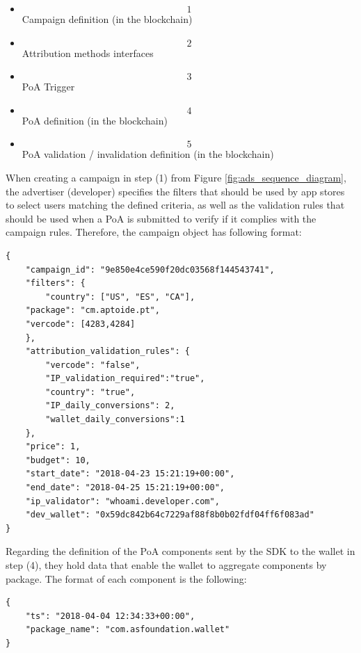 \begin{itemize}
\item \[1\] Campaign definition (in the blockchain)
\item \[2\] Attribution methods interfaces 
\item \[3\] PoA Trigger
\item \[4\] PoA definition (in the blockchain) 
\item \[5\] PoA validation / invalidation definition (in the blockchain)
\end{itemize}


When creating a campaign in step \textsf{(1)} from Figure \ref{fig:ads_sequence_diagram}, the advertiser (developer) specifies the filters that should be used by app stores to select users matching the defined criteria, as well as the validation rules that should be used when a \textsf{PoA} is submitted to verify if it complies with the campaign rules. Therefore, the campaign object has following format:
\begin{tcolorbox}[enhanced jigsaw,sharp corners, drop fuzzy shadow=ShadowColor]
\begin{lstlisting}[xleftmargin=0.05\textwidth]
{
    "campaign_id": "9e850e4ce590f20dc03568f144543741",
    "filters": {
        "country": ["US", "ES", "CA"],
	"package": "cm.aptoide.pt",
	"vercode": [4283,4284]
    },
    "attribution_validation_rules": {
        "vercode": "false",
        "IP_validation_required":"true",
        "country": "true",
        "IP_daily_conversions": 2,
        "wallet_daily_conversions":1
    },
    "price": 1,
    "budget": 10,
    "start_date": "2018-04-23 15:21:19+00:00",
    "end_date": "2018-04-25 15:21:19+00:00",
    "ip_validator": "whoami.developer.com",
    "dev_wallet": "0x59dc842b64c7229af88f8b0b02fdf04ff6f083ad"
}
\end{lstlisting}
\end{tcolorbox}

Regarding the definition of the \textsf{PoA} components sent by the SDK to the wallet in step \textsf{(4)}, they hold data that enable the wallet to aggregate components by package. The format of each component is the following:
\begin{tcolorbox}[enhanced jigsaw,sharp corners, drop fuzzy shadow=ShadowColor]
\begin{lstlisting}[xleftmargin=0.05\textwidth]
{
    "ts": "2018-04-04 12:34:33+00:00",
    "package_name": "com.asfoundation.wallet"
}
\end{lstlisting}
\end{tcolorbox}

